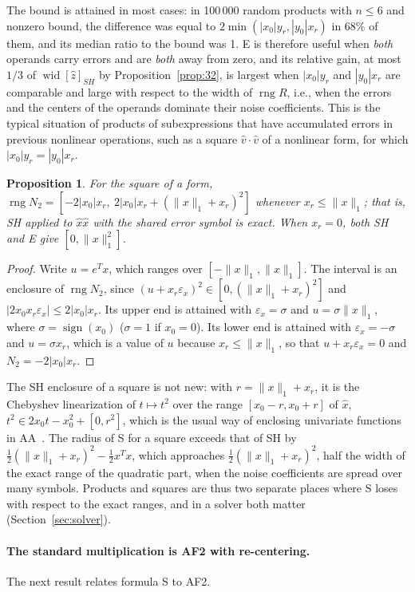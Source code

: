 \documentclass[10pt]{article}
\newtheorem{propo}{Proposition}
\theoremstyle{definition}
\newcommand{\eps}{\varepsilon}
\newcommand{\ex}{\eps_x}
\newcommand{\rng}{\operatorname{rng}}
\newcommand{\wid}{\operatorname{wid}}
\begin{document}
The bound is attained in most cases: in 100\,000 random products with $n\le6$ and nonzero bound, the difference was equal to $2\min(|x_0|y_r,|y_0|x_r)$ in 68\% of them, and its median ratio to the bound was 1. E is therefore useful when \emph{both} operands carry errors and are \emph{both} away from zero, and its relative gain, at most $1/3$ of $\wid[\hat z]_{SH}$ by Proposition~\ref{prop:32}, is largest when $|x_0|y_r$ and $|y_0|x_r$ are comparable and large with respect to the width of $\rng R$, i.e., when the errors and the centers of the operands dominate their noise coefficients. This is the typical situation of products of subexpressions that have accumulated errors in previous nonlinear operations, such as a square $\hat v\cdot\hat v$ of a nonlinear form, for which $|x_0|y_r=|y_0|x_r$.

\begin{propo}
\label{prop:square}
For the square of a form, $\rng N_2 = [-2|x_0|x_r,\ 2|x_0|x_r+(\|x\|_1+x_r)^2]$ whenever $x_r\le\|x\|_1$; that is, SH applied to $\hat x\hat x$ with the shared error symbol is exact. When $x_r=0$, both SH and E give $[0,\|x\|_1^2]$.
\end{propo}
\begin{proof}
Write $u=e^Tx$, which ranges over $[-\|x\|_1,\|x\|_1]$. The interval is an enclosure of $\rng N_2$, since $(u+x_r\ex)^2\in[0,(\|x\|_1+x_r)^2]$ and $|2x_0x_r\ex|\le2|x_0|x_r$. Its upper end is attained with $\ex=\sigma$ and $u=\sigma\|x\|_1$, where $\sigma=\operatorname{sign}(x_0)$ ($\sigma=1$ if $x_0=0$). Its lower end is attained with $\ex=-\sigma$ and $u=\sigma x_r$, which is a value of $u$ because $x_r\le\|x\|_1$, so that $u+x_r\ex=0$ and $N_2=-2|x_0|x_r$.
\end{proof}
The SH enclosure of a square is not new: with $r=\|x\|_1+x_r$, it is the Chebyshev linearization of $t\mapsto t^2$ over the range $[x_0-r,x_0+r]$ of $\hat x$, $t^2\in 2x_0t-x_0^2+[0,r^2]$, which is the usual way of enclosing univariate functions in AA~\cite{stolfi1997self}. The radius of S for a square exceeds that of SH by $\tfrac12(\|x\|_1+x_r)^2-\tfrac12x^Tx$, which approaches $\tfrac12(\|x\|_1+x_r)^2$, half the width of the exact range of the quadratic part, when the noise coefficients are spread over many symbols. Products and squares are thus two separate places where S loses with respect to the exact ranges, and in a solver both matter (Section~\ref{sec:solver}).

\paragraph{The standard multiplication is AF2 with re-centering.} The next result relates formula S to AF2.
\end{document}
